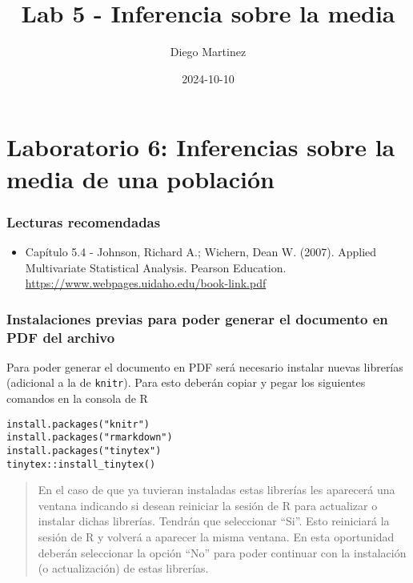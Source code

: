\documentclass[
]{article}
\title{Lab 5 - Inferencia sobre la media}
\author{Diego Martinez}
\date{2024-10-10}
\providecommand{\tightlist}{%
  \setlength{\itemsep}{0pt}\setlength{\parskip}{0pt}}
\begin{document}
\maketitle

\section{Laboratorio 6: Inferencias sobre la media de una
población}\label{laboratorio-6-inferencias-sobre-la-media-de-una-poblaciuxf3n}

\subsubsection{Lecturas recomendadas}\label{lecturas-recomendadas}

\begin{itemize}
\tightlist
\item
  Capítulo 5.4 - Johnson, Richard A.; Wichern, Dean W. (2007). Applied
  Multivariate Statistical Analysis. Pearson Education.
  \href{https://www.webpages.uidaho.edu/~stevel/519/Applied\%20Multivariate\%20Statistical\%20Analysis\%20by\%20Johnson\%20and\%20Wichern.pdf}{https://www.webpages.uidaho.edu/book-link.pdf}
\end{itemize}

\subsubsection{Instalaciones previas para poder generar el documento en
PDF del
archivo}\label{instalaciones-previas-para-poder-generar-el-documento-en-pdf-del-archivo}

Para poder generar el documento en PDF será necesario instalar nuevas
librerías (adicional a la de \texttt{knitr}). Para esto deberán copiar y
pegar los siguientes comandos en la consola de R

\begin{verbatim}
install.packages("knitr") 
install.packages("rmarkdown") 
install.packages("tinytex") 
tinytex::install_tinytex()
\end{verbatim}

\begin{quote}
En el caso de que ya tuvieran instaladas estas librerías les aparecerá
una ventana indicando si desean reiniciar la sesión de R para actualizar
o instalar dichas librerías. Tendrán que seleccionar ``Si''. Esto
reiniciará la sesión de R y volverá a aparecer la misma ventana. En esta
oportunidad deberán seleccionar la opción ``No'' para poder continuar
con la instalación (o actualización) de estas librerías.
\end{quote}
\end{document}
